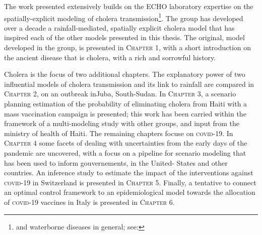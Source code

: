The work presented extensively builds on the ECHO laboratory expertise on the spatially-explicit modeling of cholera transmission\footnote{and waterborne diseases in general; see: }. The group has developed over a decade a rainfall-mediated, spatially explicit cholera model that has inspired each of the other models presented in this thesis. The original,  model developed in the group, is presented in \textsc{Chapter 1}, with a short introduction on the ancient disease that is cholera, with a rich and sorrowful history.

Cholera is the focus of two additional chapters. The explanatory power of two influential models of cholera transmission and its link to rainfall are compared in \textsc{Chapter 2}, on an outbreak inJuba, South-Sudan. In \textsc{Chapter 3}, a scenario planning estimation of the probability of eliminating cholera from Haiti with a mass vaccination campaign is presented; this work has been carried within the framework of a multi-modeling study with other groups, and input from the ministry of health of Haiti.
The remaining chapters focuse on \textsc{covid}-19. In \textsc{Chapter 4} some facets of dealing with uncertainties from the early days of the pandemic are uncovered, with a focus on a pipeline for scenario modeling that has been used to inform gouvernements, in the United- States and other countries. 
An inference study to estimate the impact of the interventions against \textsc{covid}-19 in Switzerland is presented in \textsc{Chapter 5}.
Finally, a tentative to connect an optimal control framework to an epidemiological model towards the allocation of \textsc{covid}-19 vaccines in Italy is presented in \textsc{Chapter 6}.

